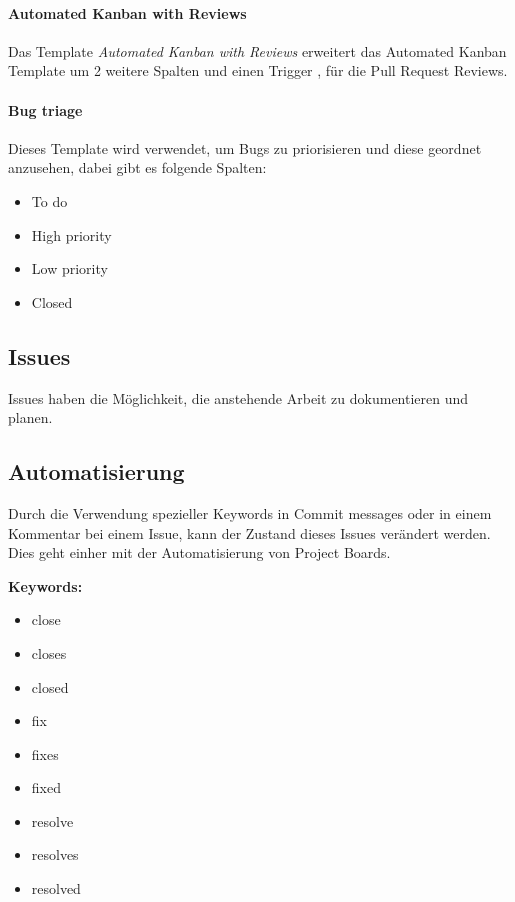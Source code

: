 \paragraph{Automated Kanban with Reviews}
Das Template \emph{Automated Kanban with Reviews} erweitert das Automated Kanban Template um 2 weitere Spalten und einen Trigger
, für die Pull Request Reviews.

\paragraph{Bug triage}
Dieses Template wird verwendet, um Bugs zu priorisieren und diese geordnet anzusehen, dabei gibt es folgende Spalten:

\begin{itemize}
    \item To do
    \item High priority
    \item Low priority
    \item Closed
\end{itemize}

\subsection{Issues}
Issues haben die Möglichkeit, die anstehende Arbeit zu dokumentieren und planen.

\cite{github-issues}

\subsection{Automatisierung}
Durch die Verwendung spezieller Keywords in Commit messages oder in einem Kommentar bei einem Issue, kann der Zustand dieses
Issues verändert werden.
Dies geht einher mit der Automatisierung von Project Boards.

\textbf{Keywords:}

\begin{itemize}
    \item close
    \item closes
    \item closed
    \item fix
    \item fixes
    \item fixed
    \item resolve
    \item resolves
    \item resolved
\end{itemize}

